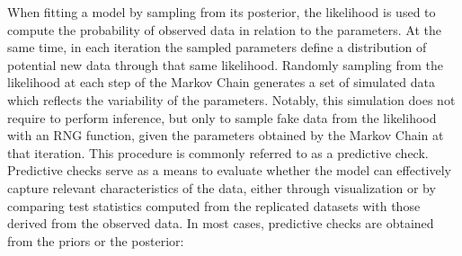 When fitting a model by sampling from its posterior, the likelihood is used to compute the probability of observed data in relation to the
parameters. At the same time, in each iteration the sampled parameters define a distribution of potential new data through that same likelihood. 
Randomly sampling from the likelihood at each step of the Markov Chain generates a set of simulated data which reflects the
variability of the parameters. Notably, this simulation does not require to perform inference, but
only to sample fake data from the likelihood with an RNG function, given the parameters obtained by the Markov Chain at
that iteration.
This procedure is commonly referred to as a predictive check. Predictive checks serve as a means to evaluate whether
the model can effectively capture relevant characteristics of the data, either through visualization or by comparing
test statistics computed from the replicated datasets with those derived from the observed data. In most cases,
predictive checks are obtained from the priors or the posterior:


